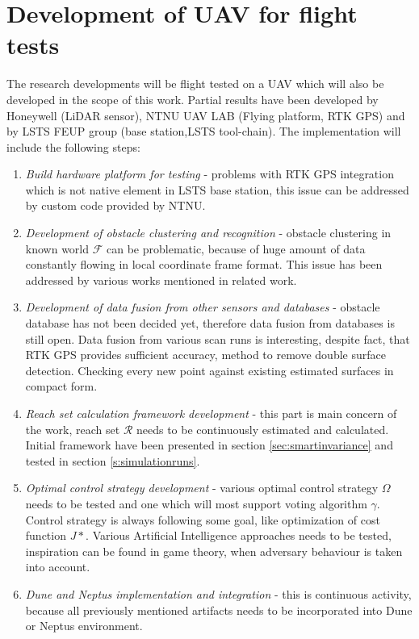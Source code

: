 \section{Development of UAV for flight tests}
The research developments will be flight tested on a UAV which will also be developed in the scope of this work. 
Partial results have been developed by Honeywell (LiDAR sensor), NTNU UAV LAB (Flying platform, RTK GPS) and by LSTS FEUP group (base station,LSTS tool-chain). The implementation will include the following steps:
\begin{enumerate}
    \item \textit{Build hardware platform for testing} - problems with RTK GPS integration which is not native element in LSTS base station, this issue can be addressed by custom code provided by NTNU.
    \item \textit{Development of obstacle clustering and recognition} - obstacle clustering in known world $\mathscr{F}$ can be problematic, because of huge amount of data constantly flowing in local coordinate frame format. This issue has been addressed by various works mentioned in related work. 
    \item \textit{Development of data fusion from other sensors and databases} - obstacle database has not been decided yet, therefore data fusion from databases is still open. Data fusion from various scan runs is interesting, despite fact, that RTK GPS provides sufficient accuracy, method to remove double surface detection. Checking every new point against existing estimated surfaces in compact form.
    \item \textit{Reach set calculation framework development} - this part is main concern of the work, reach set $\mathscr{R}$ needs to be continuously estimated and calculated. Initial framework have been presented in section \ref{sec:smartinvariance} and tested in section \ref{s:simulationruns}.
    \item \textit{Optimal control strategy development} - various optimal control strategy $\Omega$ needs to be tested and one which will most support voting algorithm $\gamma$. Control strategy is always following some goal, like optimization of cost function $J*$. Various Artificial Intelligence approaches needs to be tested, inspiration can be found in game theory, when adversary behaviour is taken into account.
    \item \textit{Dune and Neptus implementation and integration} - this is continuous activity, because all previously mentioned artifacts needs to be incorporated into Dune or Neptus environment.
\end{enumerate}



